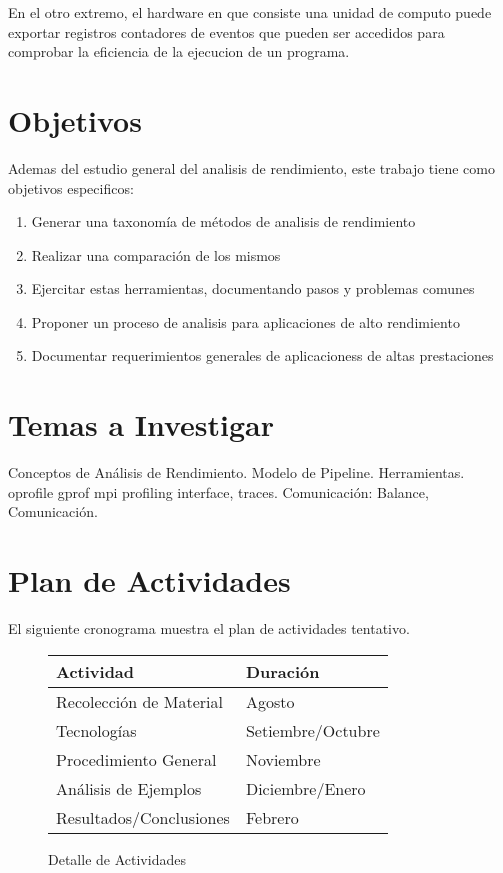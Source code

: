 \documentclass[a4paper,twocolumn]{article}
\begin{document}
En el otro extremo, el hardware en que consiste una unidad de computo puede exportar
registros contadores de eventos que pueden ser accedidos para comprobar la
eficiencia de la ejecucion de un programa.

\section{Objetivos}

Ademas del estudio general del analisis de rendimiento, este trabajo tiene como
objetivos especificos:

\begin{enumerate}
\item Generar una taxonom\'ia de m\'etodos de analisis de rendimiento
\item Realizar una comparaci\'on de los mismos
\item Ejercitar estas herramientas, documentando pasos y problemas comunes
\item Proponer un proceso de analisis para aplicaciones de alto rendimiento
\item Documentar requerimientos generales de aplicacioness de altas prestaciones
\end{enumerate}

\section{Temas a Investigar}

Conceptos de An\'alisis de Rendimiento.
Modelo de Pipeline.
Herramientas.
oprofile \cite{oprofile}
gprof \cite{gprof}
mpi profiling interface, traces. \cite{mpi}
Comunicaci\'on: Balance, Comunicaci\'on.

\section{Plan de Actividades}

El siguiente cronograma muestra el plan de actividades tentativo.

\begin{figure}[H]
  \begin{center}
    \begin{tabular}{|l|l|}\hline
      {\bf Actividad} & {\bf Duraci\'on} \\ \hline
      Recolecci\'on de Material & Agosto \\ \hline
      Tecnolog\'ias & Setiembre/Octubre \\ \hline
      Procedimiento General & Noviembre \\ \hline
      An\'alisis de Ejemplos & Diciembre/Enero \\ \hline
      Resultados/Conclusiones & Febrero \\ \hline
    \end{tabular}
    \caption{Detalle de Actividades}
  \end{center}
  \label{schedule}
\end{figure}
\end{document}
